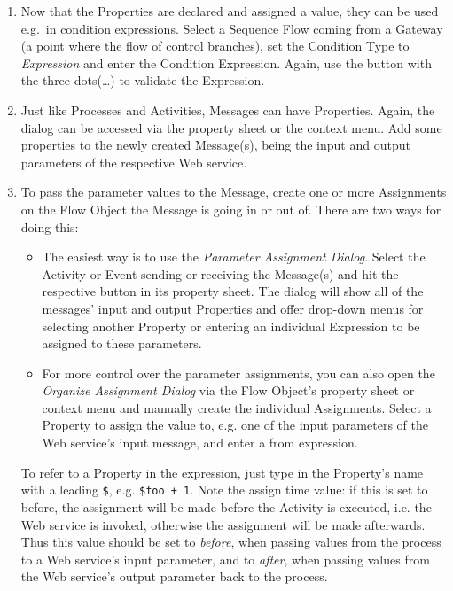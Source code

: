 \begin{enumerate}
	\item Now that the Properties are declared and assigned a value, they can be used e.g.\ in
	condition expressions. Select a Sequence Flow coming from a Gateway (a point where the flow of
	control branches), set the Condition Type to \emph{Expression} and enter the Condition
	Expression. Again, use the button with the three dots(\dots) to validate the Expression.
	
	\item Just like Processes and Activities, Messages can have Properties. Again, the dialog can be
	accessed via the property sheet or the context menu. Add some properties to the newly created
	Message(s), being the input and output parameters of the respective Web service.
	
	\item To pass the parameter values to the Message, create one or more Assignments on the Flow
	Object the Message is going in or out of. There are two ways for doing this:
	\begin{itemize}
		\item The easiest way is to use the \emph{Parameter Assignment Dialog}. Select the Activity
		or Event sending or receiving the Message(s) and hit the respective button in its property
		sheet. The dialog will show all of the messages' input and output Properties and offer
		drop-down menus for selecting another Property or entering an individual Expression to be
		assigned to these parameters.
		\item For more control over the parameter assignments, you can also open the \emph{Organize
		Assignment Dialog} via the Flow Object's property sheet or context menu and manually create
		the individual Assignments. Select a Property to assign the value to, e.g. one of the input
		parameters of the Web service's input message, and enter a from expression.
	\end{itemize}
	 To refer to a Property in the expression, just type in the Property's name with a leading
	 \verb|$|, e.g. \verb|$foo + 1|. Note the assign time value: if this is set to before, the
	 assignment will be made before the Activity is executed, i.e. the Web service is invoked,
	 otherwise the assignment will be made afterwards. Thus this value should be set to
	 \emph{before}, when passing values from the process to a Web service's input parameter, and to
	 \emph{after}, when passing values from the Web service's output parameter back to the process.
\end{enumerate}


